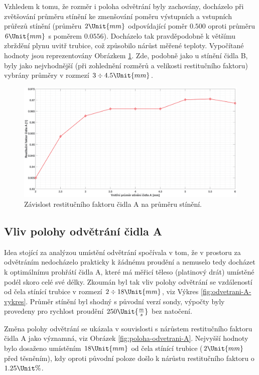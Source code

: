         \newpage
        Vzhledem k tomu, že rozměr i poloha odvětrání byly zachovány, docházelo při zvětšování průměru stínění ke zmenšování poměru výstupních a vstupních průřezů stínění (průměru $2 \Unit{mm}$ odpovídající poměr $0.500$ oproti průměru $6 \Unit{mm}$ s poměrem $0.0556$). Docházelo tak pravděpodobně k většímu zbrždění plynu uvitř trubice, což způsobilo nárůst měřené teploty. Vypočítané hodnoty jsou reprezentovány Obrázkem \ref{fig:prumer-stineni-A}. Zde, podobně jako u stínění čidla B, byly jako nejvhodnější (při zohlednění rozměrů a velikosti restitučního faktoru) vybrány průměry v rozmezí $3 \div 4.5 \Unit{mm}$.
        
        \begin{figure}[ht!]
            \centering
            \includegraphics*[width=\textwidth]{400_SIMULACE_KONSTRUKCNICH_UPRAV/Grafy/05_prumer_stineni_A}
            \caption{Závislost restitučního faktoru čidla A na průměru stínění.}
            \label{fig:prumer-stineni-A}
        \end{figure}
    
   \newpage
     \subsection{Vliv polohy odvětrání čidla A}
        Idea stojící za analýzou umístění odvětrání spočívala v tom, že v prostoru za odvětráním nedocházelo prakticky k žádnému proudění a nemuselo tedy docházet k optimálnímu prohřátí čidla A, které má měřicí těleso (platinový drát) umístěné podél skoro celé své délky. Zkoumán byl tak vliv polohy odvětrání se vzdáleností od čela stínící trubice v rozmezí $2 \div 18 \Unit{mm}$, viz Výkres \ref{fig:odvetrani-A-vykres}. Průměr stínění byl shodný s původní verzí sondy, výpočty byly provedeny pro rychlost proudění $250 \Unit{\frac{m}{s}}$ bez natočení.

        Změna polohy odvětrání se ukázala v souvislosti s nárůstem restitučního faktoru čidla A jako významná, viz Obrázek \ref{fig:poloha-odvetrani-A}. Nejvyšší hodnoty bylo dosaženo umístěním $18 \Unit{mm}$ od čela stínící trubice ($2 \Unit{mm}$ před těsněním), kdy oproti původní poloze došlo k nárůstu restitučního faktoru o $1.25 \Unit{\%}$.
        
